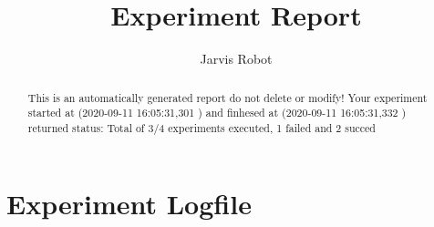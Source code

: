 \title{Experiment Report}
\author{Jarvis Robot}
\maketitle

\begin{abstract}
This is an automatically generated report do not delete or modify!
Your experiment started at (2020-09-11 16:05:31,301 ) and finhesed at (2020-09-11 16:05:31,332 )
returned status:  Total of 3/4 experiments executed, 1 failed and 2 succed
\end{abstract}


\section{Experiment Logfile}

